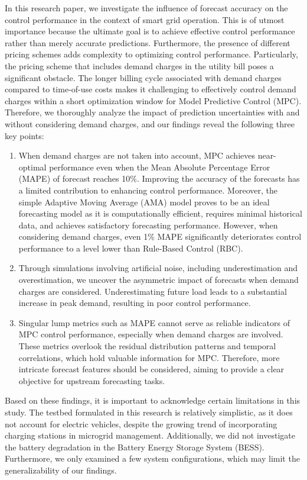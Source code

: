 
In this research paper, we investigate the influence of forecast accuracy on the control performance in the context of smart grid operation. This is of utmost importance because the ultimate goal is to achieve effective control performance rather than merely accurate predictions. Furthermore, the presence of different pricing schemes adds complexity to optimizing control performance. Particularly, the pricing scheme that includes demand charges in the utility bill poses a significant obstacle. The longer billing cycle associated with demand charges compared to time-of-use costs makes it challenging to effectively control demand charges within a short optimization window for Model Predictive Control (MPC). Therefore, we thoroughly analyze the impact of prediction uncertainties with and without considering demand charges, and our findings reveal the following three key points:

\begin{enumerate}
    \item When demand charges are not taken into account, MPC achieves near-optimal performance even when the Mean Absolute Percentage Error (MAPE) of forecast reaches 10\%. Improving the accuracy of the forecasts has a limited contribution to enhancing control performance. Moreover, the simple Adaptive Moving Average (AMA) model proves to be an ideal forecasting model as it is computationally efficient, requires minimal historical data, and achieves satisfactory forecasting performance. However, when considering demand charges, even 1\% MAPE significantly deteriorates control performance to a level lower than Rule-Based Control (RBC).
    \item Through simulations involving artificial noise, including underestimation and overestimation, we uncover the asymmetric impact of forecasts when demand charges are considered. Underestimating future load leads to a substantial increase in peak demand, resulting in poor control performance.
    \item Singular lump metrics such as MAPE cannot serve as reliable indicators of MPC control performance, especially when demand charges are involved. These metrics overlook the residual distribution patterns and temporal correlations, which hold valuable information for MPC. Therefore, more intricate forecast features should be considered, aiming to provide a clear objective for upstream forecasting tasks.
\end{enumerate}

Based on these findings, it is important to acknowledge certain limitations in this study. The testbed formulated in this research is relatively simplistic, as it does not account for electric vehicles, despite the growing trend of incorporating charging stations in microgrid management. Additionally, we did not investigate the battery degradation in the Battery Energy Storage System (BESS). Furthermore, we only examined a few system configurations, which may limit the generalizability of our findings.

